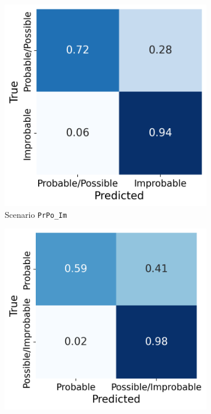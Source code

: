 \documentclass[Journal,letterpaper, SingleSpace, InsideFigs]{ascelike-new}
\begin{document}
\begin{figure}[ht]
\begin{subfigure}[t]{.25\linewidth}
    \includegraphics[width=\linewidth]{opt-confusion-matrix-PrPo_Im-128-px.png}
    \caption{Scenario \texttt{PrPo\_Im}}
    \label{prpo_im_cm}
  \end{subfigure}%
  \begin{subfigure}[t]{.25\linewidth}
    \centering
    \includegraphics[width=\linewidth]{opt-confusion-matrix-Pr_PoIm-128-px.png}

\end{subfigure}
\end{figure}
\end{document}
